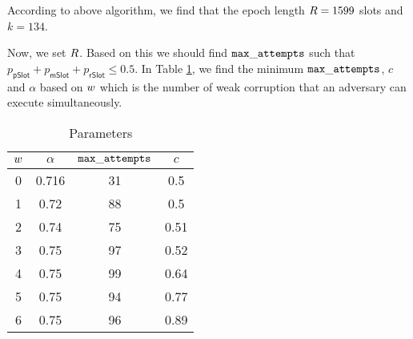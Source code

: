 According to above algorithm, we find that the epoch length $ R = 1599 $ slots and $ k = 134 $.

Now, we set $ R $. Based on this we should find $ \mathtt{max\_attempts} $ such that $ p_{\mathsf{pSlot}} + p_\mathsf{mSlot} + p_\mathsf{rSlot} \leq 0.5$. In Table \ref{tb:param}, we find the minimum $ \mathtt{max\_attempts} $, $ c $ and $ \alpha $ based on $ w $ which is the number of weak corruption that an adversary can execute simultaneously.



\begin{table}
	\centering
	\begin{tabular}{|c|c|c|c|}
		\hline
		$ w $ & $ \alpha $ & $ \mathtt{max\_attempts} $& $ c $  \\\hline
		0&0.716&31&0.5 \\ \hline
		1&0.72&88&0.5 \\ \hline
		2&0.74&75&0.51 \\ \hline
		3&0.75&97&0.52 \\ \hline
		4&0.75&99&0.64 \\ \hline
		5&0.75&94&0.77 \\ \hline
		6&0.75&96&0.89 \\ \hline
	\end{tabular}
\caption{Parameters}
\label{tb:param}
\end{table}






 
 
 
 